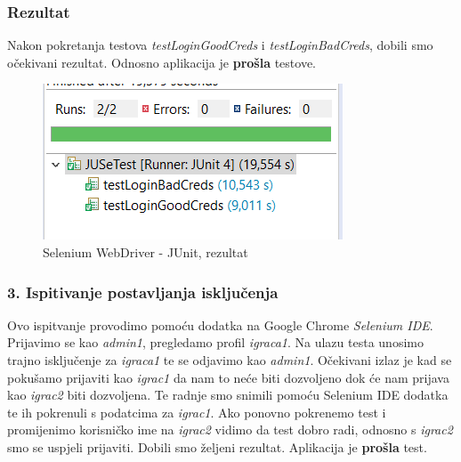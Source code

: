 			\subsubsection{Rezultat}
			
				{Nakon pokretanja testova \emph{testLoginGoodCreds} i \emph{testLoginBadCreds}, dobili smo očekivani rezultat. Odnosno aplikacija je \textbf{prošla} testove.}
			
					\begin{figure}[H]
						\includegraphics[width=\textwidth]{slike/rezultat_JUSeTest} 
						\centering
						\caption{Selenium WebDriver - JUnit, rezultat}
						\label{}
					\end{figure}
				
			\subsubsection{3. Ispitivanje postavljanja isključenja}
			
				{Ovo ispitvanje provodimo pomoću dodatka na Google Chrome \emph{Selenium IDE}. Prijavimo se kao \emph{admin1}, pregledamo profil \emph{igraca1}. Na ulazu testa unosimo trajno isključenje za \emph{igraca1} te se odjavimo kao \emph{admin1}. Očekivani izlaz je kad se pokušamo prijaviti kao \emph{igrac1} da nam to neće biti dozvoljeno dok će nam prijava kao \emph{igrac2} biti dozvoljena. Te radnje smo snimili pomoću Selenium IDE dodatka te ih pokrenuli s podatcima za \emph{igrac1}. Ako ponovno pokrenemo test i promijenimo korisničko ime na \emph{igrac2} vidimo da test dobro radi, odnosno s \emph{igrac2} smo se uspjeli prijaviti. Dobili smo željeni rezultat. Aplikacija je \textbf{prošla} test.}
					
